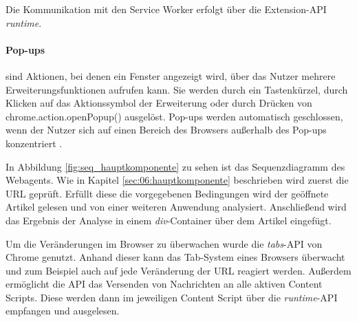 Die Kommunikation mit den Service Worker erfolgt über die Extension-API \textit{runtime}.

\paragraph{Pop-ups} sind Aktionen, bei denen ein Fenster angezeigt wird, über das Nutzer mehrere Erweiterungsfunktionen aufrufen kann. 
Sie werden durch ein Tastenkürzel, durch Klicken auf das Aktionssymbol der Erweiterung oder durch Drücken von chrome.action.openPopup() ausgelöst. 
Pop-ups werden automatisch geschlossen, wenn der Nutzer sich auf einen Bereich des Browsers außerhalb des Pop-ups konzentriert \cite{chrome2025popups}.

In Abbildung \ref{fig:seq_hauptkomponente} zu sehen ist das Sequenzdiagramm des Webagents. Wie in Kapitel \ref{sec:06:hauptkomponente} beschrieben
wird zuerst die URL geprüft. Erfüllt diese die vorgegebenen Bedingungen wird der geöffnete Artikel gelesen und von einer weiteren Anwendung
analysiert. Anschließend wird das Ergebnis der Analyse in einem \textit{div}-Container über dem Artikel eingefügt.

Um die Veränderungen im Browser zu überwachen wurde die \textit{tabs}-API von Chrome genutzt. Anhand dieser kann das Tab-System eines Browsers überwacht
und zum Beispiel auch auf jede Veränderung der URL reagiert werden.
Außerdem ermöglicht die API das Versenden von Nachrichten an alle aktiven Content Scripts. Diese werden dann im jeweiligen Content Script über die
\textit{runtime}-API empfangen und ausgelesen.


